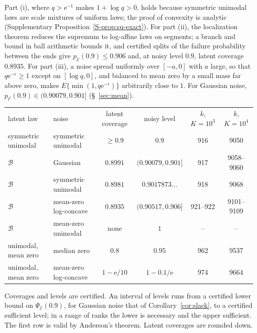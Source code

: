 \documentclass[lineno]{biometrika}
\begin{document}
Part (i), where $q > \mathrm{e}^{-1}$ makes $1 + \log q > 0$, holds because symmetric unimodal laws are scale mixtures of uniform laws; the proof of convexity is analytic (Supplementary Proposition~\ref{S-prop:su-exact}). For part (ii), the localization theorem \citep{fradelizi2004} reduces the supremum to log-affine laws on segments; a branch and bound in ball arithmetic bounds it, and certified splits of the failure probability between the ends give $p_{\mathcal E}(0.9) \le 0.906$ and, at noisy level $0.9$, latent coverage $0.8935$. For part (iii), a noise spread uniformly over $[-a, 0]$ with $a$ large, so that $q\mathrm{e}^{-\epsilon} \ge 1$ except on $[\log q, 0]$, and balanced to mean zero by a small mass far above zero, makes $E\{\min(1, q\mathrm{e}^{-\epsilon})\}$ arbitrarily close to $1$. For Gaussian noise, $p_{\mathcal E}(0.9) \in (0.90079, 0.901]$ (\S~\ref{sec:mean}).

\begin{table}
{\begin{tabular}{llcccc}
latent law & noise & latent coverage & noisy level & $k$, $K = 10^3$ & $k$, $K = 10^4$ \\
symmetric unimodal & symmetric unimodal & $\ge 0.9$ & $0.9$ & 916 & 9050 \\
$\mathcal B$ & Gaussian & $0.8991$ & $(0.90079, 0.901]$ & 917 & 9058--9060 \\
$\mathcal B$ & symmetric unimodal & $0.8981$ & $0.9017873\ldots$ & 918 & 9068 \\
$\mathcal B$ & mean-zero log-concave & $0.8935$ & $(0.90517, 0.906]$ & 921--922 & 9101--9109 \\
$\mathcal B$ & mean-zero unimodal & none & $1$ & -- & -- \\
unimodal, mean zero & median zero & $0.8$ & $0.95$ & 962 & 9537 \\
unimodal, mean zero & mean-zero log-concave & $1 - \mathrm{e}/10$ & $1 - 0.1/\mathrm{e}$ & 974 & 9664 \\
\end{tabular}}
\label{tab:map}
\begin{tabnote}
Coverages and levels are certified. An interval of levels runs from a certified lower bound on $\Psi_{\mathcal E}(0.9)$, for Gaussian noise that of Corollary~\ref{cor:slack}, to a certified sufficient level; in a range of ranks the lower is necessary and the upper sufficient. The first row is valid by Anderson's theorem. Latent coverages are rounded down.
\end{tabnote}
\end{table}
\end{document}
